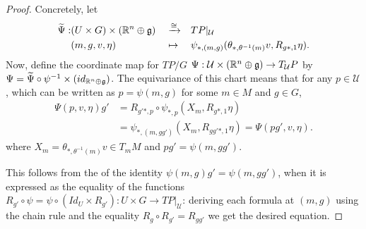 \begin{proof}
Concretely, let
\begin{align*}
    \Tilde \Psi :& (U \times G) \times (\RR^n \oplus \alg g) && \xrightarrow{\cong} && TP|_{\mathcal U} \\    
                 & (m, g, v, \eta)&& \mapsto &&\psi_{*, (m, g)}(\theta_{*, \theta^{-1}(m)} v, R_{g*, 1} \eta).
\end{align*}
Now, define the coordinate map for $TP/G$ $\Psi : \mathcal U \times (\mathbb{R}^n \oplus \mathfrak{g})  \to  T_{\mathcal U}P$ by $\Psi = \widetilde \Psi \circ \psi^{-1} \times (id_{\mathbb{R}^n \oplus \mathfrak{g}})$. %
The equivariance of this chart %
 means that for any $p \in \mathcal U$, which can be written as $p = \psi(m, g)$ for some $m \in M$ and $g \in G$,
\begin{align*}
    \Psi(p, v, \eta) g' &=R_{g'*, p} \circ \psi_{*, p}(X_m, R_{g*, 1} \eta)\\
    &= \psi_{*, (m, gg')}(X_m, R_{gg'*, 1} \eta) = \Psi(pg', v, \eta).
\end{align*} where $X_m = \theta_{*, \theta^{-1}(m)} v \in T_m M$ and $pg' = \psi(m, gg')$.

This follows from the of the identity $\psi(m, g) g' = \psi(m, gg')$, when it is expressed as the equality of the functions $R_{g'} \circ \psi = \psi \circ (Id_U \times R_{g'}) : U \times G \to TP|_{\mathcal U}$: deriving each formula at $(m, g)$ using the chain rule and the equality $R_g \circ R_{g'} = R_{gg'}$ we get the desired equation.%


\end{proof}
